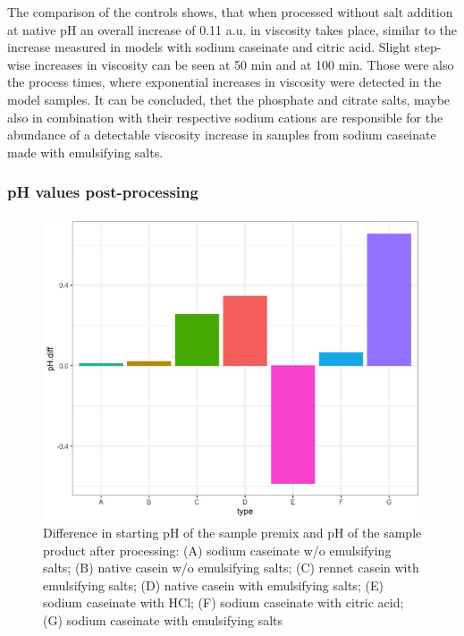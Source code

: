 \documentclass[
]{article}
\begin{document}
The comparison of the controls shows, that when processed without salt
addition at native pH an overall increase of 0.11 a.u. in viscosity
takes place, similar to the increase measured in models with sodium
caseinate and citric acid. Slight step-wise increases in viscosity can
be seen at 50 min and at 100 min. Those were also the process times,
where exponential increases in viscosity were detected in the model
samples. It can be concluded, thet the phosphate and citrate salts,
maybe also in combination with their respective sodium cations are
responsible for the abundance of a detectable viscosity increase in
samples from sodium caseinate made with emulsifying salts.

\subsubsection{pH values post-processing}

\begin{figure}
\includegraphics[width=0.6\linewidth]{plots/1.9_pH} \caption[Difference in pH value of tested samples after processing]{Difference in starting pH of the sample premix and pH of the sample product after processing:  (A) sodium caseinate w/o emulsifying salts; (B) native casein w/o emulsifying salts;  (C) rennet casein with emulsifying salts; (D) native casein with emulsifying salts; (E) sodium caseinate with HCl; (F) sodium caseinate with citric acid; (G) sodium caseinate with emulsifying salts}\label{fig:unnamed-chunk-12}
\end{figure}
\end{document}
